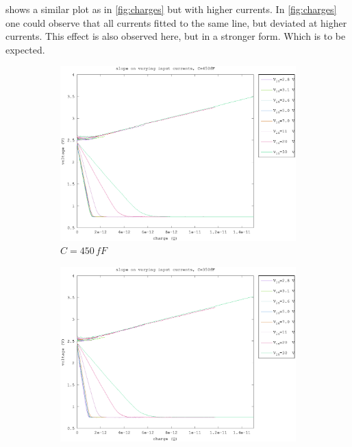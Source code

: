  shows a similar plot as in \cref{fig:charges} but with higher currents. In \cref{fig:charges} one could observe that all currents fitted to the same line, but deviated at higher currents. This effect is also observed here, but in a stronger form. Which is to be expected.

\begin{figure}[h]
    \centering
    \begin{subfigure}[b]{0.475\textwidth}
        \centering
        \includegraphics[width=\textwidth]{fig/bre_charge_450fF.eps}
        \caption[Network2]%
        {$C=450\,fF$}    
        \label{fig:bre_charges_450fF}
    \end{subfigure}
    \hfill
    \begin{subfigure}[b]{0.475\textwidth}  
        \centering 
        \includegraphics[width=\textwidth]{fig/bre_charge_350fF.eps}

\end{subfigure}
\end{figure}
